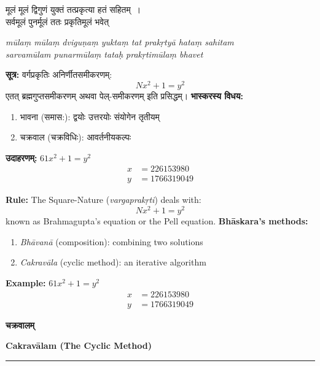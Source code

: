 \documentclass[11pt,a4paper]{article}
\newcommand{\dev}[1]{{\devanagarifont #1}}
\newcommand{\bicol}[2]{%
\noindent%
\begin{minipage}[t]{0.48\textwidth}
\begin{flushleft}
\small
#1
\end{flushleft}
\end{minipage}%
\hfill%
\begin{minipage}[t]{0.48\textwidth}
\begin{flushleft}
\small
#2
\end{flushleft}
\end{minipage}%
\vspace{0.4em}
}
\newcommand{\bicolverse}[2]{%
\par\noindent%
\begin{minipage}[t]{0.48\textwidth}
\centering
\color{versecolor}
\devanagarifont
\small
#1
\end{minipage}%
\hfill%
\begin{minipage}[t]{0.48\textwidth}
\centering
\color{versecolor}
\small
#2
\end{minipage}%
\par\vspace{0.4em}
}
\newcommand{\sectionbicol}[2]{%
\vspace{0.5em}
\noindent%
\begin{minipage}[t]{0.48\textwidth}
\begin{center}
\large\bfseries\color{sectioncolor}
\dev{#1}
\end{center}
\end{minipage}%
\hfill%
\begin{minipage}[t]{0.48\textwidth}
\begin{center}
\large\bfseries\color{sectioncolor}
#2
\end{center}
\end{minipage}%
\vspace{0.3em}
\noindent\rule{\textwidth}{0.4pt}
}
\begin{document}
\vspace{0.3cm}

\bicolverse{%
मूलं मूलं द्विगुणं युक्तं तत्प्रकृत्या हतं सहितम्~।\\
सर्वमूलं पुनर्मूलं ततः प्रकृतिमूलं भवेत्~
}{%
\textit{m\={u}la\d{m} m\={u}la\d{m} dvigu\d{n}a\d{m} yukta\d{m} tat prak\d{r}ty\={a} hata\d{m} sahitam}\\
\textit{sarvam\={u}lam punarm\={u}la\d{m} tata\d{h} prak\d{r}tim\={u}la\d{m} bhavet}
}

\vspace{0.5cm}

\bicol{%
\textbf{सूत्र:} वर्गप्रकृतिः अनिर्णीतसमीकरणम्:
\[Nx^2 + 1 = y^2\]
एतत् ब्रह्मगुप्तसमीकरणम् अथवा पेल्-समीकरणम् इति प्रसिद्धम्।
\vspace{0.3cm}
\textbf{भास्करस्य विधय:}
\begin{enumerate}[leftmargin=1.5em,topsep=0pt]
\item \dev{भावना} (समास:): द्वयोः उत्तरयोः संयोगेन तृतीयम्
\item \dev{चक्रवाल} (चक्रविधिः): आवर्तनीयकल्पः
\end{enumerate}
\textbf{उदाहरणम्:} $61x^2 + 1 = y^2$
\begin{align*}
x &= 226153980 \\
y &= 1766319049
\end{align*}
}{%
\textbf{Rule:} The Square-Nature (\textit{vargaprak\d{r}ti}) deals with:
\[Nx^2 + 1 = y^2\]
known as Brahmagupta's equation or the Pell equation.
\vspace{0.3cm}
\textbf{Bh\={a}skara's methods:}
\begin{enumerate}[leftmargin=1.5em,topsep=0pt]
\item \textit{Bh\={a}van\={a}} (composition): combining two solutions
\item \textit{Cakrav\={a}la} (cyclic method): an iterative algorithm
\end{enumerate}
\textbf{Example:} $61x^2 + 1 = y^2$
\begin{align*}
x &= 226153980 \\
y &= 1766319049
\end{align*}
}

\clearpage

\sectionbicol{चक्रवालम्}{Cakrav\={a}lam (The Cyclic Method)}

\vspace{0.3cm}
\end{document}
